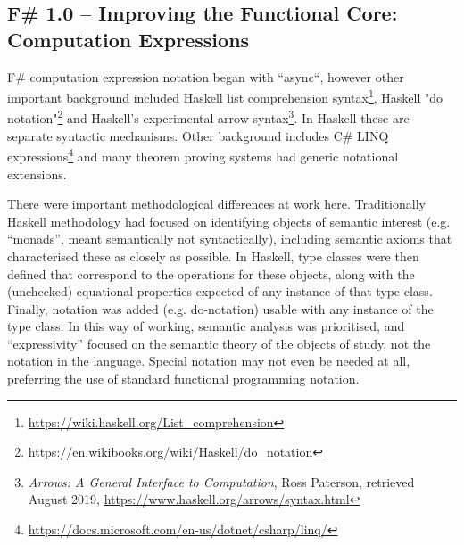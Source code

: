 \documentclass[acmsmall]{acmart}\settopmatter{}
\begin{document}
\subsection*{F\# 1.0 – Improving the Functional Core: Computation Expressions}

F\# computation expression notation began with ``async``, however other important background included Haskell list comprehension syntax\footnote{\url{https://wiki.haskell.org/List_comprehension}}, Haskell "do notation"\footnote{\url{https://en.wikibooks.org/wiki/Haskell/do_notation}} and Haskell's experimental
arrow syntax\footnote{\textit{Arrows: A General Interface to Computation}, Ross Paterson, retrieved August 2019, \url{https://www.haskell.org/arrows/syntax.html}}.
In Haskell these are separate syntactic mechanisms.
Other background includes C\# LINQ expressions\footnote{\url{https://docs.microsoft.com/en-us/dotnet/csharp/linq/}} and many
theorem proving systems had generic notational extensions.

There were important methodological differences at work here.  Traditionally Haskell methodology had focused on
identifying objects of semantic interest (e.g. ``monads'', meant semantically not syntactically), including
semantic axioms that characterised these as closely as possible. In Haskell, type classes were then defined that
correspond to the operations for these objects, along with the (unchecked) equational properties
expected of any instance of that type class. Finally, notation was added (e.g. do-notation) usable with
any instance of the type class.  In this way of working, semantic analysis was prioritised, and ``expressivity'' focused on the semantic theory of the objects of study,
not the notation in the language. Special notation may not even be needed at all, preferring the use of standard functional programming notation.
\end{document}
